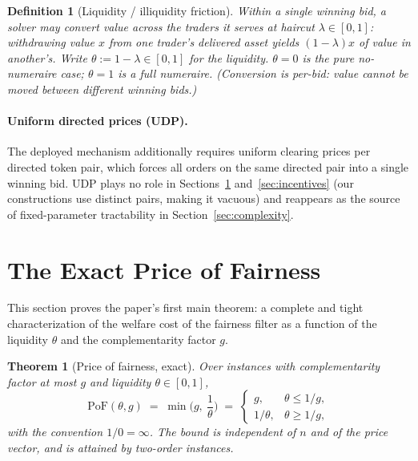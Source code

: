 \documentclass[11pt]{article}
\newtheorem{theorem}{Theorem}
\newtheorem{definition}{Definition}
\theoremstyle{remark}
\newcommand{\PoF}{\mathrm{PoF}}
\begin{document}
\begin{definition}[Liquidity / illiquidity friction]\label{def:theta}
Within a single winning bid, a solver may convert value across the traders
it serves at haircut $\lambda\in[0,1]$: withdrawing value $x$ from one
trader's delivered asset yields $(1-\lambda)x$ of value in another's. Write
$\theta:=1-\lambda\in[0,1]$ for the \emph{liquidity}. $\theta=0$ is the pure
no-numeraire case; $\theta=1$ is a full numeraire. (Conversion is per-bid:
value cannot be moved between different winning bids.)
\end{definition}

\paragraph{Uniform directed prices (UDP).}
The deployed mechanism additionally requires uniform clearing prices per
directed token pair, which forces all orders on the same directed pair into
a single winning bid. UDP plays no role in Sections~\ref{sec:pof}
and~\ref{sec:incentives} (our constructions use distinct pairs, making it
vacuous) and reappears as the source of fixed-parameter tractability in
Section~\ref{sec:complexity}.

\section{The Exact Price of Fairness}\label{sec:pof}

This section proves the paper's first main theorem: a complete and tight
characterization of the welfare cost of the fairness filter as a function of
the liquidity $\theta$ and the complementarity factor $g$.

\begin{theorem}[Price of fairness, exact]\label{thm:pof}
Over instances with complementarity factor at most $g$ and liquidity
$\theta\in[0,1]$,
\[
\PoF(\theta,g)\;=\;\min\!\Big(g,\ \frac1\theta\Big)
\;=\;
\begin{cases}
g, & \theta\le 1/g,\\[2pt]
1/\theta, & \theta\ge 1/g,
\end{cases}
\]
with the convention $1/0=\infty$. The bound is independent of $n$ and of the
price vector, and is attained by two-order instances.
\end{theorem}
\end{document}
